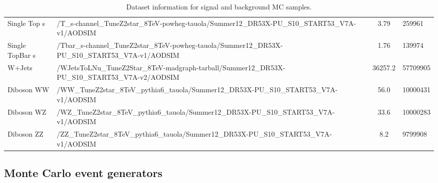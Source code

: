 \begin{table}
\begin{center}
\begin{tabular}{|l| p{12.5cm} |c|p{2cm}|}
	Single Top s & /T\_s-channel\_TuneZ2star\_8TeV-powheg-tauola/Summer12\_DR53X-PU\_S10\_START53\_V7A-v1/AODSIM & 3.79 & 259961 \\
	Single TopBar s & /Tbar\_s-channel\_TuneZ2star\_8TeV-powheg-tauola/Summer12\_DR53X-PU\_S10\_START53\_V7A-v1/AODSIM  & 1.76 & 139974 \\
\hline	
	W+Jets & /WJetsToLNu\_TuneZ2Star\_8TeV-madgraph-tarball/Summer12\_DR53X-PU\_S10\_START53\_V7A-v2/AODSIM & 36257.2 & 57709905\\
\hline	
	Diboson WW & /WW\_TuneZ2star\_8TeV\_pythia6\_tauola/Summer12\_DR53X-PU\_S10\_START53\_V7A-v1/AODSIM & 56.0 & 10000431\\
	Diboson WZ & /WZ\_TuneZ2star\_8TeV\_pythia6\_tauola/Summer12\_DR53X-PU\_S10\_START53\_V7A-v1/AODSIM & 33.6 & 10000283\\
	Diboson ZZ & /ZZ\_TuneZ2star\_8TeV\_pythia6\_tauola/Summer12\_DR53X-PU\_S10\_START53\_V7A-v1/AODSIM & 8.2 & 9799908\\
\hline	
\end{tabular}
\caption{Dataset information for signal and background MC samples.}
\end{center}
\end{table}

\subsection{Monte Carlo event generators}


